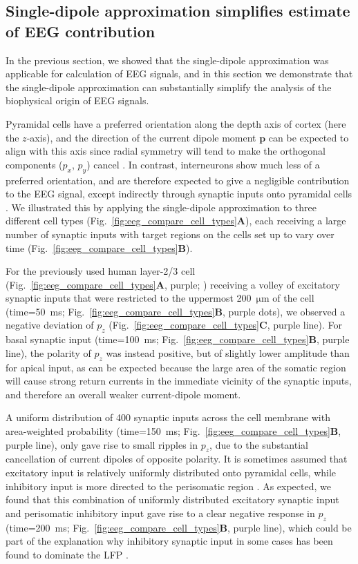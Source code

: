 \documentclass[preprint,10pt,authoryear]{elsarticle}
\newcommand{\hlp}[2][Purple]{ {\sethlcolor{#1} \hl{#2}} }
\newcommand{\gen}[1]{\color{white}{\hlp{GTE: #1 }}\color{black}}
\begin{document}
\subsection{Single-dipole approximation simplifies estimate of EEG contribution}\label{subsec:compare_neurons}
In the previous section, we showed that the single-dipole approximation was applicable for calculation of EEG signals, and in this section we demonstrate that the single-dipole approximation can substantially simplify the analysis of the biophysical origin of EEG signals.

Pyramidal cells have a preferred orientation along the depth axis of cortex (here the $z$-axis), and the direction of the current dipole moment $\mathbf{p}$ can be expected to align with this axis since
radial symmetry will tend to make the orthogonal components ($p_x$, $p_y$) cancel \citep{HAGEN2018}. 
In contrast, interneurons show much less of a preferred orientation, and are therefore expected to give a negligible contribution to the EEG signal, except indirectly through synaptic inputs onto pyramidal cells \citep{HAGEN2016}.
We illustrated this by applying the single-dipole approximation to three different cell types (Fig.~\ref{fig:eeg_compare_cell_types}\textbf{A}), each receiving a large number of synaptic inputs with target regions on the cells set up to vary over time (Fig.~\ref{fig:eeg_compare_cell_types}\textbf{B}).

For the previously used human layer-2/3 cell (Fig.~\ref{fig:eeg_compare_cell_types}\textbf{A}, purple; \cite{EYAL2016})
receiving a volley of excitatory synaptic inputs that were restricted to the uppermost 200~$\si{\um}$ of the cell (time=50~ms; Fig.~\ref{fig:eeg_compare_cell_types}\textbf{B}, purple dots), we observed a negative deviation of $p_z$ (Fig.~\ref{fig:eeg_compare_cell_types}\textbf{C}, purple line). For basal synaptic input (time=100~ms; Fig.~\ref{fig:eeg_compare_cell_types}\textbf{B}, purple line), the polarity of $p_z$ was instead positive, but of slightly lower amplitude than for apical input, as can be expected because the large area of the somatic region will cause strong return currents in the immediate vicinity of the synaptic inputs, and therefore an overall weaker current-dipole moment.


A uniform distribution of 400 synaptic inputs across the cell membrane with area-weighted probability (time=150~ms; Fig.~\ref{fig:eeg_compare_cell_types}\textbf{B}, purple line), only gave rise to small ripples in $p_z$, due to the substantial cancellation of current dipoles of opposite polarity. It is sometimes assumed that excitatory input is relatively uniformly distributed onto pyramidal cells, while inhibitory input is more directed to the perisomatic region \citep{Mazzoni2015, Telenczuk2019, Skaar2020, Telenczuk2020}. As expected, we found that this combination of uniformly distributed excitatory synaptic input and perisomatic inhibitory input gave rise to a clear negative response in $p_z$ (time=200~ms; Fig.~\ref{fig:eeg_compare_cell_types}\textbf{B}, purple line), which could be part of the explanation why inhibitory synaptic input in some cases has been found to dominate the LFP \citep{HAGEN2016, TELENCZUK2016}.
\end{document}
